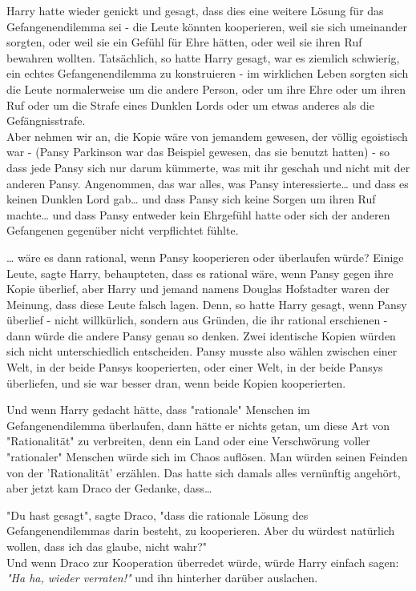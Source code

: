 {Harry hatte wieder genickt und gesagt, dass dies eine weitere Lösung für das Gefangenendilemma sei - die Leute könnten kooperieren, weil sie sich umeinander sorgten, oder weil sie ein Gefühl für Ehre hätten, oder weil sie ihren Ruf bewahren wollten. Tatsächlich, so hatte Harry gesagt, war es ziemlich schwierig, ein echtes Gefangenendilemma zu konstruieren - im wirklichen Leben sorgten sich die Leute normalerweise um die andere Person, oder um ihre Ehre oder um ihren Ruf oder um die Strafe eines Dunklen Lords oder um etwas anderes als die Gefängnisstrafe.\\ Aber nehmen wir an, die Kopie wäre von jemandem gewesen, der völlig egoistisch war - (Pansy Parkinson war das Beispiel gewesen, das sie benutzt hatten) - so dass jede Pansy sich nur darum kümmerte, was mit ihr geschah und nicht mit der anderen Pansy. Angenommen, das war alles, was Pansy interessierte… und dass es keinen Dunklen Lord gab… und dass Pansy sich keine Sorgen um ihren Ruf machte… und dass Pansy entweder kein Ehrgefühl hatte oder sich der anderen Gefangenen gegenüber nicht verpflichtet fühlte.

… wäre es dann rational, wenn Pansy kooperieren oder überlaufen würde? Einige Leute, sagte Harry, behaupteten, dass es rational wäre, wenn Pansy gegen ihre Kopie überlief, aber Harry und jemand namens Douglas Hofstadter waren der Meinung, dass diese Leute falsch lagen. Denn, so hatte Harry gesagt, wenn Pansy überlief - nicht willkürlich, sondern aus Gründen, die ihr rational erschienen - dann würde die andere Pansy genau so denken. Zwei identische Kopien würden sich nicht unterschiedlich entscheiden. Pansy musste also wählen zwischen einer Welt, in der beide Pansys kooperierten, oder einer Welt, in der beide Pansys überliefen, und sie war besser dran, wenn beide Kopien kooperierten.

Und wenn Harry gedacht hätte, dass "rationale" Menschen im Gefangenendilemma überlaufen, dann hätte er nichts getan, um diese Art von "Rationalität" zu verbreiten, denn ein Land oder eine Verschwörung voller "rationaler" Menschen würde sich im Chaos auflösen. Man würden seinen Feinden von der 'Rationalität' erzählen. Das hatte sich damals alles vernünftig angehört, aber jetzt kam Draco der Gedanke, dass…

"Du hast gesagt", sagte Draco, "dass die rationale Lösung des Gefangenendilemmas darin besteht, zu kooperieren. Aber du würdest natürlich wollen, dass ich das glaube, nicht wahr?"\\ Und wenn Draco zur Kooperation überredet würde, würde Harry einfach sagen:\\ \emph{"Ha ha, wieder verraten!"} und ihn hinterher darüber auslachen.

}
